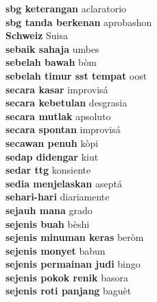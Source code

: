 \textbf{ sbg keterangan  } aclaratorio \\
\textbf{ sbg tanda berkenan  } aprobashon \\
\textbf{ Schweiz  } Suisa \\
\textbf{ sebaik sahaja  } umbes \\
\textbf{ sebelah bawah  } bòm \\
\textbf{ sebelah timur sst tempat  } oost \\
\textbf{ secara kasar  } improvisá \\
\textbf{ secara kebetulan  } desgrasia \\
\textbf{ secara mutlak  } apsoluto \\
\textbf{ secara spontan  } improvisá \\
\textbf{ secawan penuh  } kòpi \\
\textbf{ sedap didengar  } kiut \\
\textbf{ sedar ttg  } konsiente \\
\textbf{ sedia menjelaskan  } aseptá \\
\textbf{ sehari-hari  } diariamente \\
\textbf{ sejauh mana  } grado \\
\textbf{ sejenis buah  } bèshi \\
\textbf{ sejenis minuman keras  } beròm \\
\textbf{ sejenis monyet  } babun \\
\textbf{ sejenis permainan judi  } bingo \\
\textbf{ sejenis pokok renik  } basora \\
\textbf{ sejenis roti panjang  } baguèt \\
